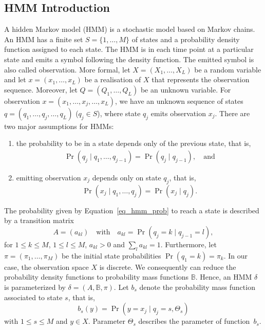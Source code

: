 \subsection{HMM Introduction}
A hidden Markov model (HMM) is a stochastic model based on Markov chains.
An HMM has a finite set $S = \{1, \ldots, M\}$ of states and a probability density function assigned to each state.
The HMM is in each time point at a particular state and emits a symbol following the density function.
The emitted symbol is also called observation.
More formal, let $X = (X_1, \ldots, X_L)$ be a random variable and let $x=(x_1, \ldots, x_L)$ be a realisation of $X$ that represents the observation sequence.
Moreover, let $Q = (Q_1, \ldots, Q_L)$ be an unknown variable.
For observation $x=(x_1, \ldots, x_j, \ldots, x_L)$, we have an unknown sequence of states $q = (q_1, \ldots, q_j, \ldots, q_L)$ ($q_j \in S$), where state $q_j$ emits observation $x_j$.
There are two major assumptions for HMMs:
\begin{enumerate}
 \item the probability to be in a state depends only of the previous state, that is,
 \begin{align} 
   \Pr(q_j \mid q_1, \ldots, q_{j-1}) = \Pr(q_j \mid q_{j-1}) , \quad \text{and} \label{eq_hmm_prob}
 \end{align}
 \item emitting observation $x_j$ depends only on state $q_j$, that is,
 $$\Pr(x_j \mid q_1, \ldots, q_j) = \Pr(x_j \mid q_j).$$
\end{enumerate}
\noindent
The probability given by Equation~\ref{eq_hmm_prob} to reach a state is described by a transition matrix
$$A = (a_{kl}) \quad \text{with} \quad a_{kl} = \Pr(q_j = k \mid q_{j-1} = l),$$
for $1 \leq k \leq M$, $1 \leq l \leq M$, $a_{kl} > 0$ and $\sum_l a_{kl} = 1$.
Furthermore, let $\pi = (\pi_1, \ldots, \pi_M)$ be the initial state probabilities $\Pr(q_1 = k) = \pi_k$.
In our case, the observation space $X$ is discrete. 
We consequently can reduce the probability density functions to probability mass functions $\mathbb{B}$.
Hence, an HMM $\delta$ is parameterized by $\delta = (A, \mathbb{B}, \pi)$.
Let $b_s$ denote the probability mass function associated to state $s$, that is,
$$b_s(y) = \Pr(y = x_j \mid q_j = s, \Theta_s)$$ %
with $1 \leq s \leq M$ and $y \in X$.
Parameter $\Theta_s$ describes the parameter of function~$b_s$.

